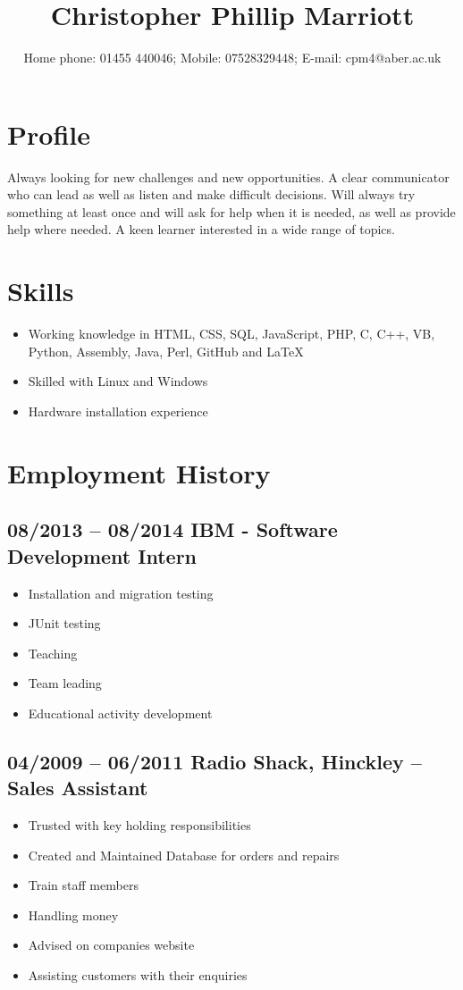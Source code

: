 \documentclass[0pt]{article}
\title{Christopher Phillip Marriott}
\date{Home phone: 01455  440046; Mobile: 07528329448; E-mail: cpm4@aber.ac.uk}
\begin{document}
\maketitle
\thispagestyle{empty}
\pagestyle{empty}

\section*{Profile}
Always looking for new challenges and new opportunities. A clear communicator who can lead as well as listen and make difficult decisions. Will always try something at least once and will ask for help when it is needed, as well as provide help where needed.  A keen learner interested in a wide range of topics.


\section*{Skills}
\begin{itemize}
	\item Working knowledge in HTML, CSS, SQL, JavaScript, PHP, C, C++, VB, Python, Assembly, Java, Perl, GitHub and LaTeX 
	\item Skilled with Linux and Windows
	\item Hardware installation experience
\end{itemize}

\section*{Employment History}

\subsection*{08/2013 -- 08/2014   IBM - Software Development Intern}
\begin{itemize}
	\item Installation and migration testing
	\item JUnit testing 
	\item Teaching
	\item Team leading
	\item Educational activity development
\end{itemize}

\subsection*{04/2009 -- 06/2011   Radio Shack, Hinckley -- Sales Assistant}
\begin{itemize}
	\item Trusted with key holding responsibilities
	\item Created and Maintained Database for orders and repairs
	\item Train staff members
	\item Handling money
	\item Advised on companies website
	\item Assisting customers with their enquiries
\end{itemize}
	
\end{document}
